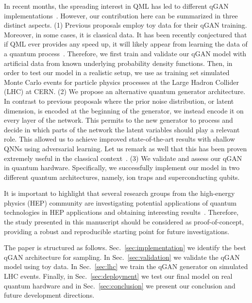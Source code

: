 \documentclass[twocolumn,preprintnumbers,superscriptaddress]{revtex4-2}
\begin{document}
In recent months, the spreading interest in QML has led to different qGAN
implementations~\cite{zoufal2019quantum, zeng2019learning, situ2020quantum,
hu2019quantum, benedetti2019adversarial, romero2021variational,
niu2021entangling}. However, our contribution here can be summarized in three
distinct aspects. (1) Previous proposals employ toy data for their qGAN
training. Moreover, in some cases, it is classical data. It has been recently
conjectured that if QML ever provides any speed up, it will likely appear from
learning the data of a quantum process~\cite{huang2021information,
kubler2021inductive}. Therefore, we first train and validate our qGAN model with
artificial data from known underlying probability density functions. Then, in
order to test our model in a realistic setup, we use as training set simulated
Monte Carlo events for particle physics processes at the Large Hadron Collider
(LHC) at CERN. (2) We propose an alternative quantum generator architecture. In contrast to
previous proposals where the prior noise distribution, or latent dimension, is
encoded at the beginning of the generator, we instead encode it on every layer
of the network. This permits to the new generator to process and decide in which
parts of the network the latent variables should play a relevant role. This
allowed us to achieve improved state-of-the-art results with shallow QNNs using
adversarial learning. Let us remark as well that this has been proven extremely
useful in the classical context~\cite{karras2019style}. (3) We validate and
assess our qGAN in quantum hardware. Specifically, we successfully implement our
model in two different quantum architectures, namely, ion traps and
superconducting qubits.

It is important to highlight that several research groups from the high-energy
physics (HEP) community are investigating potential applications of quantum
technologies in HEP applications and obtaining interesting
results~\cite{P_rez_Salinas_2021,Guan_2021,chang2021quantum,Chang_2021,Belis_2021,khattak2021fast}.
Therefore, the study presented in this manuscript should be considered as
proof-of-concept, providing a robust and reproducible starting point for future
investigations.

The paper is structured as follows. Sec.~\ref{sec:implementation} we identify
the best qGAN architecture for sampling. In Sec.~\ref{sec:validation} we
validate the qGAN model using toy data. In Sec.~\ref{sec:lhc} we train the qGAN
generator on simulated LHC events. Finally, in Sec.~\ref{sec:deployment} we test
our final model on real quantum hardware and in Sec.~\ref{sec:conclusion} we
present our conclusion and future development directions.
\end{document}
